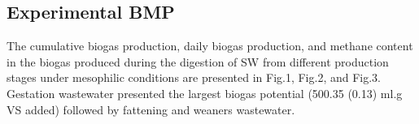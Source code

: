 \subsection{Experimental BMP}
The cumulative biogas production, daily biogas production, and methane content in the biogas produced during the digestion of SW from different production stages under mesophilic conditions are presented in Fig.1, Fig.2, and Fig.3. Gestation wastewater presented the largest biogas potential (500.35 (0.13) ml.g VS added) followed by fattening and weaners wastewater. 